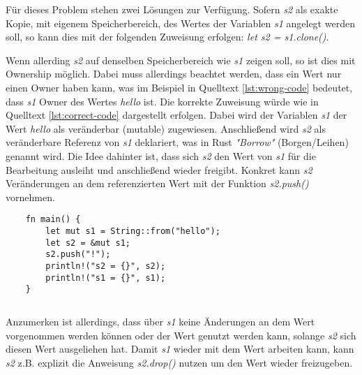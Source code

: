 Für dieses Problem stehen zwei Lösungen zur Verfügung. Sofern \textit{s2} als exakte Kopie, mit eigenem Speicherbereich, des Wertes der Variablen \textit{s1} angelegt werden soll, so kann dies mit der folgenden Zuweisung erfolgen: \textit{let s2 = s1.clone()}.\autocite{rust-ownership}\autocite{rust-the-book}\autocite{rust-by-example}

Wenn allerding \textit{s2} auf denselben Speicherbereich wie \textit{s1} zeigen soll, so ist dies mit Ownership möglich. Dabei muss allerdings beachtet werden, dass ein Wert nur einen Owner haben kann, was im Beispiel in Quelltext \ref{lst:wrong-code} bedeutet, dass \textit{s1} Owner des Wertes \textit{hello} ist. Die korrekte Zuweisung würde wie in Quelltext \ref{lst:correct-code} dargestellt erfolgen. Dabei wird der Variablen \textit{s1} der Wert \textit{hello} als veränderbar (mutable) zugewiesen. Anschließend wird \textit{s2} als veränderbare Referenz von \textit{s1} deklariert, was in Rust \textit{"Borrow"} (Borgen/Leihen) genannt wird. Die Idee dahinter ist, dass sich \textit{s2} den Wert von \textit{s1} für die Bearbeitung ausleiht und anschließend wieder freigibt. Konkret kann \textit{s2} Veränderungen an dem referenzierten Wert mit der Funktion \textit{s2.push()} vornehmen.

\begin{verbatim}
    fn main() {
        let mut s1 = String::from("hello");
        let s2 = &mut s1;
        s2.push("!");
        println!("s2 = {}", s2);
        println!("s1 = {}", s1);
    }
\end{verbatim}
\begin{lstlisting}[caption={Korrekte Zuweisung von Werten \\Quelle: \autocite{rust-ownership}}, label={lst:correct-code}]
\end{lstlisting}

Anzumerken ist allerdings, dass über \textit{s1} keine Änderungen an dem Wert vorgenommen werden können oder der Wert genutzt werden kann, solange \textit{s2} sich diesen Wert ausgeliehen hat. Damit \textit{s1} wieder mit dem Wert arbeiten kann, kann \textit{s2} z.B. explizit die Anweisung \textit{s2.drop()} nutzen um den Wert wieder freizugeben.\autocite{rust-ownership}\autocite{rust-the-book}\autocite{rust-by-example}
